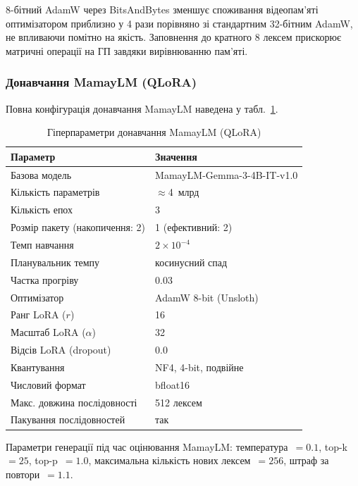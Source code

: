 \documentclass[14pt]{extarticle}
\begin{document}
8-бітний AdamW через BitsAndBytes зменшує споживання відеопам'яті оптимізатором приблизно у 4 рази порівняно зі стандартним 32-бітним AdamW, не впливаючи помітно на якість. Заповнення до кратного 8 лексем прискорює матричні операції на ГП завдяки вирівнюванню пам'яті.

\subsubsection{Донавчання MamayLM (QLoRA)}

Повна конфігурація донавчання MamayLM наведена у табл.~\ref{tab:mamaylm_hparams}.

\captionsetup[table]{justification=raggedleft}
\begin{table}[h]
\caption{Гіперпараметри донавчання MamayLM (QLoRA)}
\label{tab:mamaylm_hparams}
\setlength{\tabcolsep}{4pt}
\begin{tabular}{|p{}|p{}|}
\hline
\textbf{Параметр} & \textbf{Значення} \\
\hline
Базова модель & MamayLM-Gemma-3-4B-IT-v1.0 \\
\hline
Кількість параметрів & $\approx$4~млрд \\
\hline
Кількість епох & 3 \\
\hline
Розмір пакету (накопичення: 2) & 1 (ефективний: 2) \\
\hline
Темп навчання & $2 \times 10^{-4}$ \\
\hline
Планувальник темпу & косинусний спад \\
\hline
Частка прогріву & 0.03 \\
\hline
Оптимізатор & AdamW 8-bit (Unsloth) \\
\hline
Ранг LoRA ($r$) & 16 \\
\hline
Масштаб LoRA ($\alpha$) & 32 \\
\hline
Відсів LoRA (dropout) & 0.0 \\
\hline
Квантування & NF4, 4-bit, подвійне \\
\hline
Числовий формат & bfloat16 \\
\hline
Макс. довжина послідовності & 512 лексем \\
\hline
Пакування послідовностей & так \\
\hline
\end{tabular}
\end{table}

Параметри генерації під час оцінювання MamayLM: температура~$= 0.1$, top-k~$= 25$, top-p~$= 1.0$, максимальна кількість нових лексем~$= 256$, штраф за повтори~$= 1.1$.
\end{document}
